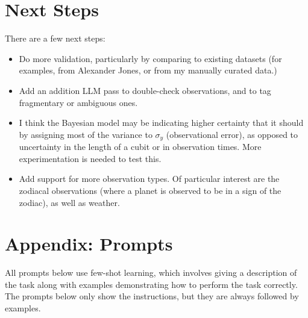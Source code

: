 \documentclass{article}
\begin{document}
\section{Next Steps}
There are a few next steps:
\begin{itemize}
    \item Do more validation, particularly by comparing to existing datasets (for examples, from Alexander Jones, or from my manually curated data.)
    \item Add an addition LLM pass to double-check observations, and to tag fragmentary or ambiguous ones.
    \item I think the Bayesian model may be indicating higher certainty that it should by assigning most of the variance to $\sigma_y$ (observational error), as opposed to uncertainty in the length of a cubit or in observation times. More experimentation is needed to test this.
    \item Add support for more observation types. Of particular interest are the zodiacal observations (where a planet is observed to be in a sign of the zodiac), as well as weather.
\end{itemize}

\medskip

\printbibliography

\section{Appendix: Prompts}
All prompts below use few-shot learning, which involves giving a description of the task along with examples demonstrating how to perform the task correctly. The prompts below only show the instructions, but they are always followed by examples.
\end{document}
